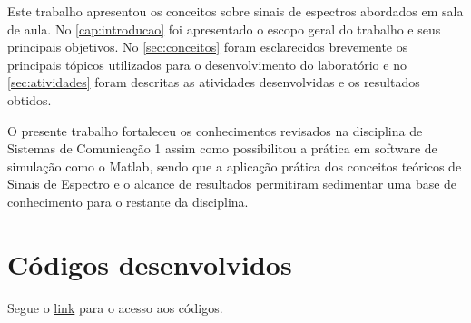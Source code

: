 \documentclass[11pt]{classes/ifscarticle}
\begin{document}
Este trabalho apresentou os conceitos sobre sinais de espectros abordados em sala de aula. No \autoref{cap:introducao} foi apresentado o escopo geral do trabalho e seus principais objetivos. No \autoref{sec:conceitos} foram esclarecidos brevemente os principais tópicos utilizados para o desenvolvimento do laboratório e no \autoref{sec:atividades} foram descritas as atividades desenvolvidas e os resultados obtidos.

O presente trabalho fortaleceu os conhecimentos revisados na disciplina de Sistemas de Comunicação 1 assim como possibilitou a prática em software de simulação como o Matlab, sendo que a aplicação prática dos conceitos teóricos de Sinais de Espectro e o alcance de resultados permitiram sedimentar uma base de conhecimento para o restante da disciplina.


\section{Códigos desenvolvidos}
\label{sec:code_dev}

Segue o \href{https://github.com/sarom-torres/COM1/tree/master/AE1}{link}
 para o acesso aos códigos.




\end{document}
